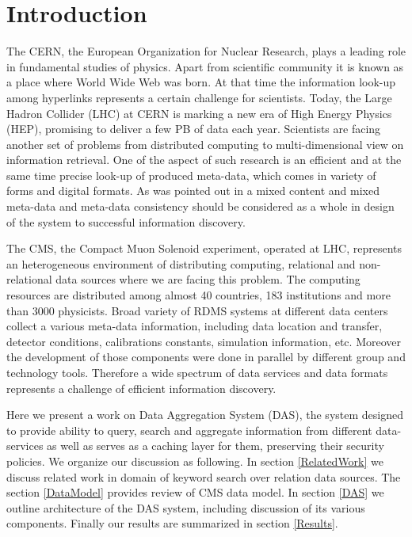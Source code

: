 \documentclass[a4paper]{jpconf}
\begin{document}
\section{Introduction}
The CERN, the European Organization for Nuclear Research, plays a leading
role in fundamental studies of physics. Apart from scientific community 
it is known as a place where World Wide Web was born. At that time the 
information look-up among hyperlinks represents a certain challenge for scientists.
Today, the Large Hadron Collider (LHC) at CERN is marking a new era of High Energy
Physics (HEP), promising to deliver a few PB of data each year. Scientists are
facing another set of problems from distributed computing to multi-dimensional
view on information retrieval. One of the aspect of such research is an efficient
and at the same time precise look-up of produced meta-data, which comes in variety 
of forms and digital formats. As was pointed out in \cite{Arms} a mixed content and 
mixed meta-data and meta-data consistency should be considered as a whole in design 
of the system to successful information discovery. 

The CMS, the Compact Muon Solenoid experiment, operated at LHC,
represents an heterogeneous environment of distributing computing, relational and
non-relational data sources where we are facing this problem. The computing resources
are distributed among almost 40 countries, 183 institutions and more than 3000 physicists.
Broad variety of RDMS systems at different data centers collect a various
meta-data information, including data location and transfer, detector conditions,
calibrations constants, simulation information, etc. Moreover the development
of those components were done in parallel by different group and technology
tools. Therefore a wide spectrum of data services and
data formats represents a challenge of efficient information discovery.

Here we present a work on Data Aggregation System (DAS), the system designed
to provide ability to query, search and aggregate information from different 
data-services as well as serves as a caching layer for them, 
preserving their security policies. We organize
our discussion as following. In section \ref{RelatedWork} we discuss
related work in domain of keyword search over relation data sources.
The section \ref{DataModel} provides review of CMS data model. In section
\ref{DAS} we outline architecture of the DAS system, including discussion of its
various components. Finally our results are summarized in section \ref{Results}.
\end{document}
